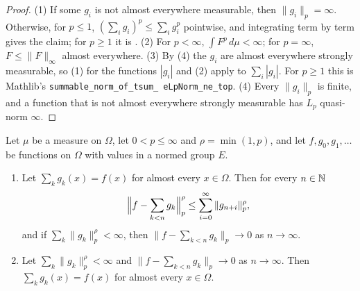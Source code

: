 \begin{proof}
\leanok
{}
(1) If some $g_i$ is not almost everywhere measurable, then $\|g_i\|_p = \infty$. Otherwise,
for $p \leq 1$, $(\sum_i g_i)^p \leq \sum_i g_i^p$ pointwise, and integrating term by term gives
the claim; for $p \geq 1$ it is . (2) For $p < \infty$,
$\int F^p \, d\mu < \infty$; for $p = \infty$, $F \leq \|F\|_\infty$ almost everywhere.
(3) By (4) the $g_i$ are almost everywhere strongly measurable, so (1) for the functions $|g_i|$
and (2) apply to $\sum_i |g_i|$. For $p \geq 1$ this is Mathlib's
\texttt{summable\_\allowbreak norm\_\allowbreak of\_\allowbreak tsum\_\allowbreak
eLpNorm\_\allowbreak ne\_\allowbreak top}. (4) Every $\|g_i\|_p$ is finite, and a function that
is not almost everywhere strongly measurable has $L_p$ quasi-norm $\infty$.
\end{proof}

\begin{lemma}
\label{lem:lp-block-series}
\leanok
Let $\mu$ be a measure on $\Omega$, let $0 < p \leq \infty$ and $\rho = \min(1, p)$, and let
$f, g_0, g_1, \dots$ be functions on $\Omega$ with values in a normed group $E$.
\begin{enumerate}
  \item Let $\sum_k g_k(x) = f(x)$ for almost every $x \in \Omega$. Then for every $n \in \mathbb{N}$
    \[
      \Bigl\| f - \sum_{k<n} g_k \Bigr\|_p^\rho \leq \sum_{i=0}^\infty \|g_{n+i}\|_p^\rho ,
    \]
    and if $\sum_k \|g_k\|_p^\rho < \infty$, then $\bigl\| f - \sum_{k<n} g_k \bigr\|_p \to 0$ as
    $n \to \infty$.
  \item Let $\sum_k \|g_k\|_p^\rho < \infty$ and $\bigl\| f - \sum_{k<n} g_k \bigr\|_p \to 0$ as
    $n \to \infty$. Then $\sum_k g_k(x) = f(x)$ for almost every $x \in \Omega$.
\end{enumerate}
\end{lemma}

